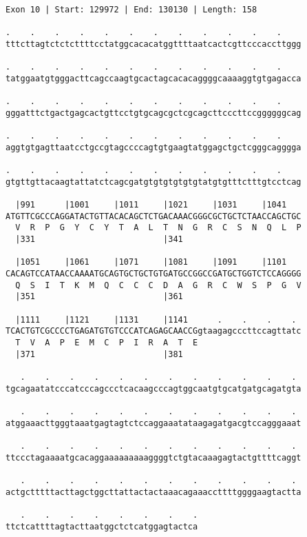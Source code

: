 \documentclass{article}
\begin{document}
\begin{Verbatim}
Exon 10 | Start: 129972 | End: 130130 | Length: 158
 
.    .    .    .    .    .    .    .    .    .    .    .    
tttcttagtctctcttttcctatggcacacatggttttaatcactcgttcccaccttggg
  
.    .    .    .    .    .    .    .    .    .    .    .    
tatggaatgtgggacttcagccaagtgcactagcacacaggggcaaaaggtgtgagacca
  
.    .    .    .    .    .    .    .    .    .    .    .    
gggatttctgactgagcactgttcctgtgcagcgctcgcagcttcccttccggggggcag
  
.    .    .    .    .    .    .    .    .    .    .    .    
aggtgtgagttaatcctgccgtagccccagtgtgaagtatggagctgctcgggcagggga
  
.    .    .    .    .    .    .    .    .    .    .    .    
gtgttgttacaagtattatctcagcgatgtgtgtgtgtgtatgtgtttctttgtcctcag
  
  |991      |1001     |1011     |1021     |1031     |1041   
ATGTTCGCCCAGGATACTGTTACACAGCTCTGACAAACGGGCGCTGCTCTAACCAGCTGC
  V  R  P  G  Y  C  Y  T  A  L  T  N  G  R  C  S  N  Q  L  P
  |331                          |341                        
  
  |1051     |1061     |1071     |1081     |1091     |1101   
CACAGTCCATAACCAAAATGCAGTGCTGCTGTGATGCCGGCCGATGCTGGTCTCCAGGGG
  Q  S  I  T  K  M  Q  C  C  C  D  A  G  R  C  W  S  P  G  V
  |351                          |361                        
  
  |1111     |1121     |1131     |1141      .    .    .    . 
TCACTGTCGCCCCTGAGATGTGTCCCATCAGAGCAACCGgtaagagcccttccagttatc
  T  V  A  P  E  M  C  P  I  R  A  T  E                     
  |371                          |381                        
  
   .    .    .    .    .    .    .    .    .    .    .    . 
tgcagaatatcccatcccagccctcacaagcccagtggcaatgtgcatgatgcagatgta
  
   .    .    .    .    .    .    .    .    .    .    .    . 
atggaaacttgggtaaatgagtagtctccaggaaatataagagatgacgtccagggaaat
  
   .    .    .    .    .    .    .    .    .    .    .    . 
ttccctagaaaatgcacaggaaaaaaaaaggggtctgtacaaagagtactgttttcaggt
  
   .    .    .    .    .    .    .    .    .    .    .    . 
actgctttttacttagctggcttattactactaaacagaaaccttttggggaagtactta
  
   .    .    .    .    .    .    .    .
ttctcattttagtacttaatggctctcatggagtactca
\end{Verbatim}
\end{document}
